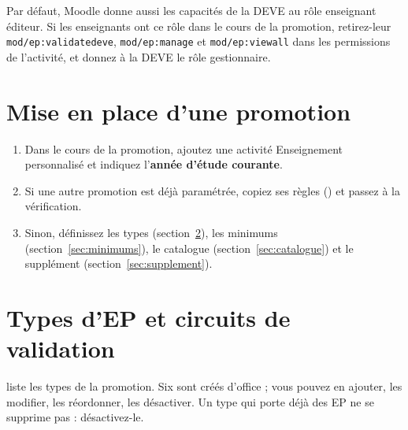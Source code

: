 \documentclass[11pt,a4paper]{article}
\begin{document}

\begin{attention}
Par défaut, Moodle donne aussi les capacités de la DEVE au rôle \og enseignant éditeur\fg{}.
Si les enseignants ont ce rôle dans le cours de la promotion, retirez-leur
\texttt{mod/ep:validatedeve}, \texttt{mod/ep:manage} et \texttt{mod/ep:viewall} dans les
permissions de l'activité, et donnez à la DEVE le rôle \og gestionnaire\fg{}.
\end{attention}

\section{Mise en place d'une promotion}

\begin{enumerate}
  \item Dans le cours de la promotion, ajoutez une activité \og Enseignement personnalisé\fg{}
    et indiquez l'\textbf{année d'étude courante}.
  \item Si une autre promotion est déjà paramétrée, copiez ses règles
    () et
    passez à la vérification.
  \item Sinon, définissez les types (section~\ref{sec:types}), les minimums
    (section~\ref{sec:minimums}), le catalogue (section~\ref{sec:catalogue}) et le supplément
    (section~\ref{sec:supplement}).
\end{enumerate}

\section{Types d'EP et circuits de validation}\label{sec:types}

 liste les types de la promotion. Six sont
créés d'office ; vous pouvez en ajouter, les modifier, les réordonner, les désactiver. Un type
qui porte déjà des EP ne se supprime pas : désactivez-le.

\end{document}
